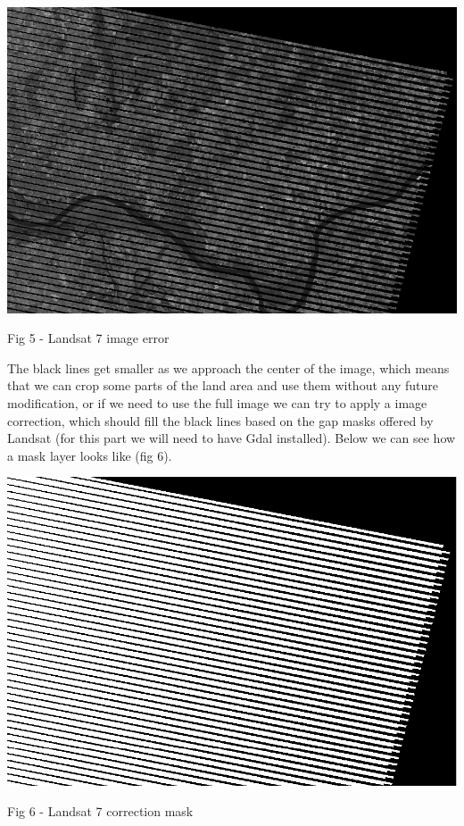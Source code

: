 \documentclass[12pt, a4paper]{report}
\begin{document}
\includegraphics[scale=0.54, center]{landsat_black_stripes.png} 
\begin{center}
Fig 5 - Landsat 7 image error
\end{center}
\par 

\quad
The black lines get smaller as we approach the center of the image, which means that we can crop some parts of the land area and use them without any future modification, or if we need to use the full image we can try to apply a image correction, which should fill the black lines based on the gap masks offered by Landsat (for this part we will need to have Gdal installed). Below we can see how a mask layer looks like (fig 6).
\par 


\bigskip

\includegraphics[scale=0.54, center]{landsat_black_stripes_correction.png} 
\begin{center}
Fig 6 - Landsat 7 correction mask
\end{center}
\par 
\end{document}
